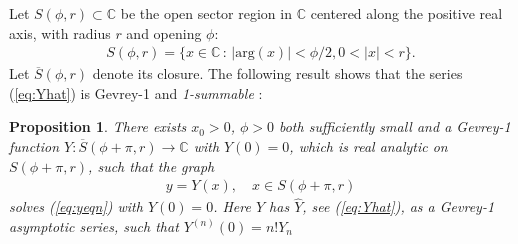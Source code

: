 \documentclass[reqno,12pt]{amsart}
\renewcommand{\eqref}[1]{(\ref{eq:#1})}
\newcommand{\proplab}[1]{\label{proposition:#1}}
\newtheorem{proposition}[theorem]{Proposition}
\numberwithin{equation}{section}
\begin{document}
 Let $S(\phi,r)\subset \mathbb C$ be the open sector region in $\mathbb C$ centered along the positive real axis, with radius $r$ and opening $\phi$:
\begin{align*}
 S(\phi,r) = \{x\in \mathbb C\,:\,\vert \text{arg}(x)\vert < \phi/2,0<\vert x\vert <r\}.
\end{align*}
Let $\overline S(\phi,r)$ denote its closure. 
The following result shows that the series \eqref{Yhat} is Gevrey-1 and \textit{1-summable} \cite{balser1994a}:
\begin{proposition}\proplab{Yexistence}
There exists $x_0>0$, $\phi>0$ both sufficiently small and a Gevrey-1 function $Y:\overline S(\phi+\pi,r)\rightarrow \mathbb C$ with $Y(0)=0$, which is real analytic on $S(\phi+\pi,r)$, such that the graph
\begin{align*}
 y = Y(x),\quad x\in S(\phi+\pi,r)
\end{align*}
solves \eqref{yeqn} with $Y(0)=0$. Here $Y$ has $\widehat Y$, see \eqref{Yhat}, as a Gevrey-1 asymptotic series, such that $Y^{(n)}(0)=n! Y_n$
 \end{proposition}
\end{document}
